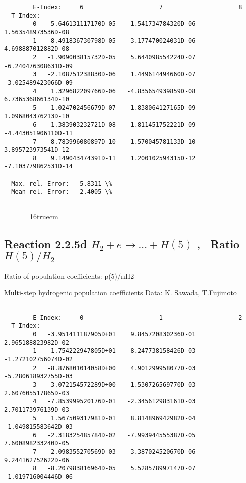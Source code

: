 \documentclass[12pt,dvipdfmx]{article}
\begin{document}
{\begin{small}
\begin{verbatim}
        E-Index:     6                     7                     8
  T-Index:
        0    5.646131117170D-05   -1.541734784320D-06    1.563548973536D-08
        1    8.491836730798D-05   -3.177470024031D-06    4.698887012882D-08
        2   -1.909003815732D-05    5.644098554224D-07   -6.240476308631D-09
        3   -2.108751238830D-06    1.449614494660D-07   -3.025489423066D-09
        4    1.329682209766D-06   -4.835654939859D-08    6.736536866134D-10
        5   -1.024702456679D-07   -1.838064127165D-09    1.096804376213D-10
        6   -1.383903232721D-08    1.811451752221D-09   -4.443051906110D-11
        7    8.783996080897D-10   -1.570045781133D-10    3.895723973541D-12
        8    9.149043474391D-11    1.200102594315D-12   -7.103779862531D-14

  Max. rel. Error:   5.8311 \%
  Mean rel. Error:   2.4005 \%


\end{verbatim}\end{small}
\begin{figure} \label{2.2.5c}
\epsfxsize=16truecm
\end{figure}
\newpage
\subsection{
Reaction 2.2.5d  $H_2 + e \rightarrow ...+ H(5)  $ , \  Ratio $H(5)/H_2 $
}

 Ratio of population coefficients: p(5)/nH2

 Multi-step hydrogenic population coefficients
 Data: K. Sawada, T.Fujimoto \cite{kn:Sawada}


\begin{small}\begin{verbatim}

        E-Index:     0                     1                     2
  T-Index:
        0   -3.951411187905D+01    9.845720830236D-01    2.965188823982D-02
        1    1.754222947805D+01    8.247738158426D-03   -1.272102756074D-02
        2   -8.876801014058D+00    4.901299958077D-03   -5.280618932755D-03
        3    3.072154572289D+00   -1.530726569770D-03    2.607605517865D-03
        4   -7.853999520176D-01   -2.345612983161D-03    2.701173976139D-03
        5    1.567509317981D-01    8.814896942982D-04   -1.049815583642D-03
        6   -2.318325485784D-02   -7.993944555387D-05    7.600898233240D-05
        7    2.098355270569D-03   -3.387024520670D-06    9.244162752622D-06
        8   -8.207983816964D-05    5.528578997147D-07   -1.019716004446D-06


\end{verbatim}
\end{small}}
\end{document}
